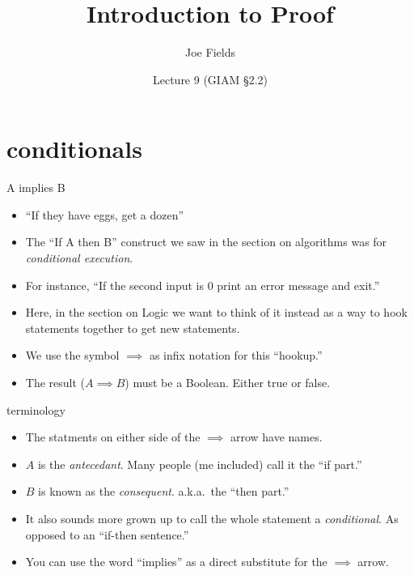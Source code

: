 \documentclass[landscape]{beamer}
\author{Joe Fields}
\title{Introduction to Proof}
\date{Lecture 9 (GIAM \S 2.2)}
\institute[SCSU]{ {\tt fieldsj1@southernct.edu} }
\begin{document}
\begin{frame}[plain]
  \titlepage
\end{frame}


\section{conditionals}

\begin{frame}{A implies B}
\begin{itemize}
\item ``If they have eggs, get a dozen'' \pause
\item The ``If A then B'' construct we saw in the section on algorithms was for {\em conditional execution}. \pause
\item For instance, ``If the second input is $0$ print an error message and exit.'' \pause
\item Here, in the section on Logic we want to think of it instead as a way to hook statements together to get new statements. \pause
\item We use the symbol $\implies$ as infix notation for this ``hookup.'' \pause
\item The result ($A \implies B$) must be a Boolean. \pause Either true or false. 
\end{itemize}
\end{frame}

\begin{frame}{terminology}
\begin{itemize}
\item The statments on either side of the $\implies$ arrow have names. \pause
\item $A$ is the {\em antecedant}. \pause \newline
Many people (me included) call it the ``if part.'' \pause
\item $B$ is known as the {\em consequent}. \pause \newline 
a.k.a.\ the ``then part.'' \pause
\item It also sounds more grown up to call the whole statement a {\em conditional}. \pause \newline 
As opposed to an ``if-then sentence.'' \pause
\item You can use the word ``implies'' as a direct substitute for the $\implies$ arrow.
\end{itemize}
\end{frame}
\end{document}
